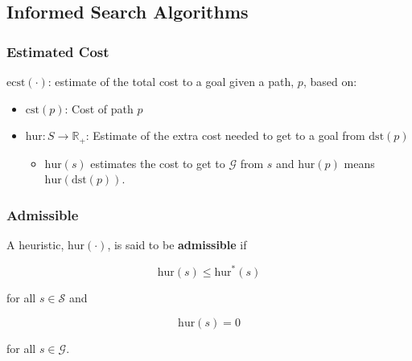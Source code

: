 \subsection{Informed Search Algorithms}
\subsubsection{Estimated Cost}
\begin{definition}
    $\text{ecst}(\cdot)$: estimate of the total cost to a goal given a path, $p$, based on:
    \begin{itemize}
        \item $\text{cst}(p)$: Cost of path $p$
        \item $\text{hur} : S \to \mathbb{R}_+$: Estimate of the extra cost needed to get to a goal from $\text{dst}(p)$
        \begin{itemize}
            \item $\text{hur}(s)$ estimates the cost to get to $\mathcal{G}$ from $s$ and $\text{hur}(p)$ means $\text{hur}(\text{dst}(p))$.
        \end{itemize}
    \end{itemize}
\end{definition}

\subsubsection{Admissible}
\begin{definition}
    A heuristic, $\text{hur}(\cdot)$, is said to be \textbf{admissible} if

    \begin{equation*}
        \text{hur}(s) \leq \text{hur}^*(s)
    \end{equation*}

    for all $s \in \mathcal{S}$ and

    \begin{equation*}
        \text{hur}(s) = 0
    \end{equation*}

    for all $s \in \mathcal{G}$.
\end{definition}

